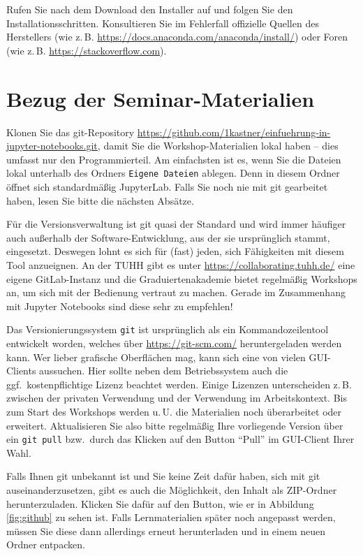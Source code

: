 \documentclass{tufte-handout}
\begin{document}
Rufen Sie nach dem Download den Installer auf und folgen Sie den Installationsschritten.
Konsultieren Sie im Fehlerfall offizielle Quellen des Herstellers (wie z.\,B. \url{https://docs.anaconda.com/anaconda/install/}) oder Foren (wie z.\,B. \url{https://stackoverflow.com}).


\section{Bezug der Seminar-Materialien}
\label{sec:git-clone}

Klonen Sie das git-Repository
\url{https://github.com/1kastner/einfuehrung-in-jupyter-notebooks.git},
damit Sie die Workshop-Materialien lokal haben -- dies umfasst nur den Programmierteil.
Am einfachsten ist es, wenn Sie die Dateien lokal unterhalb des Ordners \texttt{Eigene Dateien} ablegen.
Denn in diesem Ordner öffnet sich standardmäßig JupyterLab.
Falls Sie noch nie mit git gearbeitet haben, lesen Sie bitte die nächsten Absätze.

Für die Versionsverwaltung ist git quasi der Standard und wird immer häufiger auch außerhalb der Software-Entwicklung, aus der sie ursprünglich stammt, eingesetzt.
Deswegen lohnt es sich für (fast) jeden, sich Fähigkeiten mit diesem Tool anzueignen.
An der TUHH gibt es unter
\url{https://collaborating.tuhh.de/}
eine eigene GitLab-Instanz und die Graduiertenakademie bietet regelmäßig Workshops an, um sich mit der Bedienung vertraut zu machen.
Gerade im Zusammenhang mit Jupyter Notebooks sind diese sehr zu empfehlen!

Das Versionierungssystem \texttt{git} ist ursprünglich als ein Kommandozeilentool entwickelt worden, welches über \url{https://git-scm.com/} heruntergeladen werden kann.
Wer lieber grafische Oberflächen mag, kann sich eine von vielen GUI-Clients%
aussuchen.
Hier sollte neben dem Betriebssystem auch die ggf.\ kostenpflichtige Lizenz beachtet werden.
Einige Lizenzen unterscheiden z.\,B. zwischen der privaten Verwendung und der Verwendung im Arbeitskontext.
Bis zum Start des Workshops werden u.\,U. die Materialien noch überarbeitet oder erweitert.
Aktualisieren Sie also bitte regelmäßig Ihre vorliegende Version über ein \texttt{git pull} bzw.\ durch das Klicken auf den Button \enquote{Pull} im GUI-Client Ihrer Wahl.

Falls Ihnen git unbekannt ist und Sie keine Zeit dafür haben, sich mit git auseinanderzusetzen, gibt es auch die Möglichkeit, den Inhalt als ZIP-Ordner herunterzuladen.
Klicken Sie dafür auf den Button, wie er in Abbildung\,\ref{fig:github} zu sehen ist.
Falls Lernmaterialien später noch angepasst werden, müssen Sie diese dann allerdings erneut herunterladen und in einem neuen Ordner entpacken.
\end{document}

